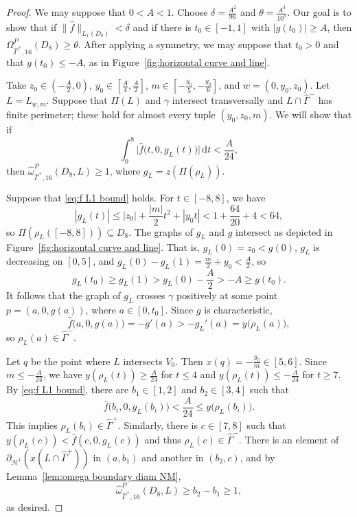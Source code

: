 \documentclass[11pt,reqno]{amsart}
\newcommand{\wwidehat}[1]{\widehat{#1}}
\newcommand{\cH}{\mathcal{H}}
\newcommand{\ud}[0]{\,\mathrm{d}}
\newcommand{\0}{\mathbf{0}}
\renewcommand{\1}{\mathbf 1}
\renewcommand{\subset}{\subseteq}
\renewcommand{\ge}{\geqslant}
\renewcommand{\le}{\leqslant}
\theoremstyle{remark}
\begin{document}
\begin{proof}
 We may suppose that $0<A<1$.  Choose $\delta=\frac{A^2}{96}$ and $\theta=\frac{A^3}{10^5}$.  Our goal is to show  that if $\|\hat{f}\|_{L_1(D_{8})}<\delta$ and if there is  $t_0\in [-1,1]$ with $|g(t_0)|\ge A$, then $\Omega^P_{\hat{\Gamma}^+,16}(D_8)\ge \theta.$
  After applying a symmetry, we may suppose that $t_0>0$ and that $g(t_0)\le -A$, as in Figure~\ref{fig:horizontal curve and line}.



 Take $z_0\in (-\frac{A}{2}, 0)$, $y_0\in [\frac{A}{4}, \frac{A}{2}]$, $m\in [-\frac{y_0}{5}, -\frac{y_0}{6}]$, and $w=(0,y_0,z_0)$.  Let $L=L_{w,m}$.  Suppose that $\Pi(L)$ and $\gamma$ intersect transversally and $L\cap \hat{\Gamma}^-$ has finite perimeter; these hold for almost every tuple $(y_0,z_0,m)$.  We will show that if
  \begin{equation}\label{eq:f L1 bound}
    \int_0^8 \big|\hat{f}\big(t,0,g_L(t)\big)\big| \ud t < \frac{A}{24},
  \end{equation}
  then $\wwidehat{\omega}^P_{\hat{\Gamma}^+,16}(D_8,L)\ge 1$, where $g_L=z(\Pi(\rho_L))$.

  Suppose that \eqref{eq:f L1 bound} holds.  For $t\in [-8,8]$, we have
  $$|g_L(t)|\le |z_0|+\frac{|m|}{2}t^2+|y_0 t|< 1 + \frac{64}{20}+4<64,$$
  so $\Pi(\rho_L([-8,8]))\subset D_8$.  The graphs of $g_L$ and $g$ intersect as depicted in Figure~\ref{fig:horizontal curve and line}.  That is, $g_L(0)=z_0<g(0)$, $g_L$ is decreasing on $[0,5]$, and $g_L(0)-g_L(1)=\frac{m}{2} + y_0<\frac{A}{2}$, so
  $$g_L(t_0) \ge g_L(1)>g_L(0)-\frac{A}{2} > -A\ge g(t_0).$$
  It follows that the graph of $g_L$ crosses $\gamma$ positively at some point $p=(a,0,g(a))$, where $a\in [0,t_0]$.  Since $g$ is characteristic,
  $$\hat{f}\big(a,0,g(a)\big)=-g'(a)>-g_L'(a)=y\big(\rho_L(a)\big),$$
  so $\rho_L(a)\in \hat{\Gamma}^-$.

  Let $q$ be the point where $L$ intersects $V_0$.  Then $x(q)=-\frac{y_0}{m}\in [5,6]$.  Since $m\le -\frac{A}{24}$, we have $y(\rho_L(t))\ge \frac{A}{24}$ for $t\le 4$ and $y(\rho_L(t))\le -\frac{A}{24}$ for $t\ge 7$.  By \eqref{eq:f L1 bound}, there are $b_1\in [1,2]$ and $b_2\in [3,4]$ such that
  $$\hat{f}\big(b_i,0,g_L(b_i)\big)<\frac{A}{24}\le y\big(\rho_L(b_i)\big).$$
  This implies $\rho_L(b_i)\in \hat{\Gamma}^+$.  Similarly, there is  $c\in [7,8]$ such that $y(\rho_L(c)) < \hat{f}(c,0,g_L(c))$ and thus $\rho_L(c)\in \hat{\Gamma}^-$.  There is an element of $\partial_{\cH^1}\left( x(L\cap \hat{\Gamma}^+)\right)$ in $(a,b_1)$ and another in $(b_2,c)$, and by Lemma~\ref{lem:omega boundary diam NM},
  $$\wwidehat{\omega}^P_{\hat{\Gamma}^+,16}(D_{8},L)\ge b_2-b_1\ge 1,$$
  as desired.


\end{proof}
\end{document}
